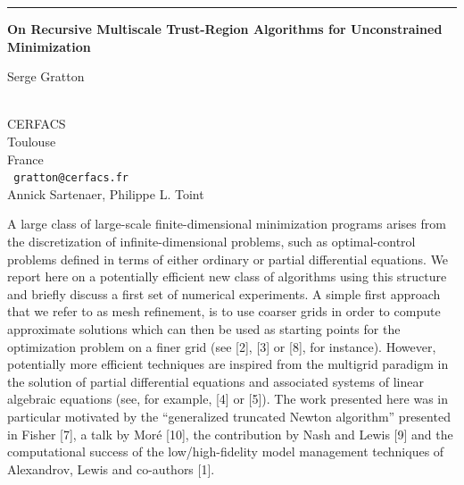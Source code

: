\documentclass[twosided]{report}
\begin{document}
\begin{center}


\rule{6in}{1pt}
\end{center}

\begin{center}
{\large			\label{gratton}
{\bf
On Recursive Multiscale Trust-Region Algorithms for Unconstrained
Minimization
}

Serge Gratton} \\
CERFACS \\ Toulouse \\ France
\\ {\tt
gratton@cerfacs.fr
}
\\
Annick Sartenaer,  Philippe L. Toint
\end{center}

A large class of large-scale finite-dimensional minimization programs
arises from the discretization of infinite-dimensional problems, such
as optimal-control problems defined in terms of either ordinary or
partial differential equations. We report here on a potentially
efficient new class of algorithms using this structure and briefly
discuss a first set of numerical experiments. A simple first approach
that we refer to as mesh refinement, is to use coarser grids in order
to compute approximate solutions which can then be used as starting
points for the optimization problem on a finer grid (see [2], [3] or
[8], for instance). However, potentially more efficient techniques are
inspired from the multigrid paradigm in the solution of partial
differential equations and associated systems of linear algebraic
equations (see, for example, [4] or [5]). The work presented here was
in particular motivated by the ``generalized truncated Newton
algorithm'' presented in Fisher [7], a talk by Mor\'{e} [10], the
contribution by Nash and Lewis [9] and the computational success of the
low/high-fidelity model management techniques of Alexandrov, Lewis and
co-authors [1].
\end{document}
